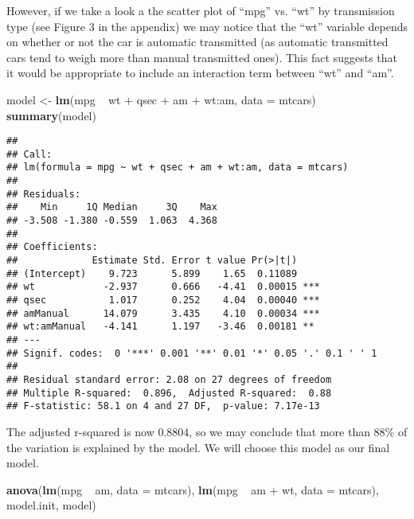 \documentclass[a3paper]{article}
\newenvironment{Shaded}{\begin{snugshade}}{\end{snugshade}}
\newcommand{\KeywordTok}[1]{\textcolor[rgb]{0.13,0.29,0.53}{\textbf{{#1}}}}
\newcommand{\DataTypeTok}[1]{\textcolor[rgb]{0.13,0.29,0.53}{{#1}}}
\newcommand{\StringTok}[1]{\textcolor[rgb]{0.31,0.60,0.02}{{#1}}}
\newcommand{\NormalTok}[1]{{#1}}
\begin{document}
However, if we take a look a the scatter plot of ``mpg'' vs. ``wt'' by
transmission type (see Figure 3 in the appendix) we may notice that the
``wt'' variable depends on whether or not the car is automatic
transmitted (as automatic transmitted cars tend to weigh more than
manual transmitted ones). This fact suggests that it would be
appropriate to include an interaction term between ``wt'' and ``am''.

\begin{Shaded}
\begin{Highlighting}[]
\NormalTok{model <-}\StringTok{ }\KeywordTok{lm}\NormalTok{(mpg ~}\StringTok{ }\NormalTok{wt +}\StringTok{ }\NormalTok{qsec +}\StringTok{ }\NormalTok{am +}\StringTok{ }\NormalTok{wt:am, }\DataTypeTok{data =} \NormalTok{mtcars)}
\KeywordTok{summary}\NormalTok{(model)}
\end{Highlighting}
\end{Shaded}

\begin{verbatim}
## 
## Call:
## lm(formula = mpg ~ wt + qsec + am + wt:am, data = mtcars)
## 
## Residuals:
##    Min     1Q Median     3Q    Max 
## -3.508 -1.380 -0.559  1.063  4.368 
## 
## Coefficients:
##             Estimate Std. Error t value Pr(>|t|)    
## (Intercept)    9.723      5.899    1.65  0.11089    
## wt            -2.937      0.666   -4.41  0.00015 ***
## qsec           1.017      0.252    4.04  0.00040 ***
## amManual      14.079      3.435    4.10  0.00034 ***
## wt:amManual   -4.141      1.197   -3.46  0.00181 ** 
## ---
## Signif. codes:  0 '***' 0.001 '**' 0.01 '*' 0.05 '.' 0.1 ' ' 1
## 
## Residual standard error: 2.08 on 27 degrees of freedom
## Multiple R-squared:  0.896,  Adjusted R-squared:  0.88 
## F-statistic: 58.1 on 4 and 27 DF,  p-value: 7.17e-13
\end{verbatim}

The adjusted r-squared is now 0.8804, so we may conclude that more than
88\% of the variation is explained by the model. We will choose this
model as our final model.

\begin{Shaded}
\begin{Highlighting}[]
\KeywordTok{anova}\NormalTok{(}\KeywordTok{lm}\NormalTok{(mpg ~}\StringTok{ }\NormalTok{am, }\DataTypeTok{data =} \NormalTok{mtcars), }\KeywordTok{lm}\NormalTok{(mpg ~}\StringTok{ }\NormalTok{am +}\StringTok{ }\NormalTok{wt, }\DataTypeTok{data =} \NormalTok{mtcars), model.init, model)}
\end{Highlighting}
\end{Shaded}
\end{document}
